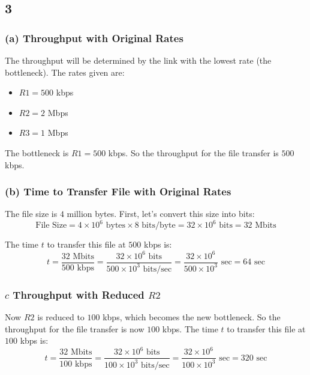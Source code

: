 \documentclass[
]{article}
\providecommand{\tightlist}{%
  \setlength{\itemsep}{0pt}\setlength{\parskip}{0pt}}
\begin{document}
\hypertarget{section-2}{%
\subsection{3}\label{section-2}}

\hypertarget{a-throughput-with-original-rates}{%
\subsubsection{(a) Throughput with Original
Rates}\label{a-throughput-with-original-rates}}

The throughput will be determined by the link with the lowest rate (the
bottleneck). The rates given are:

\begin{itemize}
\tightlist
\item
  \(R1 = 500\) kbps
\item
  \(R2 = 2\) Mbps
\item
  \(R3 = 1\) Mbps
\end{itemize}

The bottleneck is \(R1 = 500\) kbps. So the throughput for the file
transfer is \(500\) kbps.

\hypertarget{b-time-to-transfer-file-with-original-rates}{%
\subsubsection{(b) Time to Transfer File with Original
Rates}\label{b-time-to-transfer-file-with-original-rates}}

The file size is \(4\) million bytes. First, let's convert this size
into bits: \[
\text{File Size} = 4 \times 10^6 \text{ bytes} \times 8 \text{ bits/byte} = 32 \times 10^6 \text{ bits} = 32 \text{ Mbits}
\]

The time \(t\) to transfer this file at \(500\) kbps is: \[
t = \frac{{32 \text{ Mbits}}}{{500 \text{ kbps}}} = \frac{{32 \times 10^6 \text{ bits}}}{{500 \times 10^3 \text{ bits/sec}}} = \frac{{32 \times 10^6}}{{500 \times 10^3}} \text{ sec} = 64 \text{ sec}
\]

\hypertarget{c-throughput-with-reduced-r2}{%
\subsubsection{\texorpdfstring{\(c\) Throughput with Reduced
\(R2\)}{c Throughput with Reduced R2}}\label{c-throughput-with-reduced-r2}}

Now \(R2\) is reduced to \(100\) kbps, which becomes the new bottleneck.
So the throughput for the file transfer is now \(100\) kbps. The time
\(t\) to transfer this file at \(100\) kbps is: \[
t = \frac{{32 \text{ Mbits}}}{{100 \text{ kbps}}} = \frac{{32 \times 10^6 \text{ bits}}}{{100 \times 10^3 \text{ bits/sec}}} = \frac{{32 \times 10^6}}{{100 \times 10^3}} \text{ sec} = 320 \text{ sec}
\]
\end{document}
